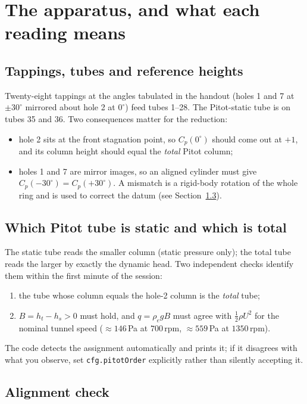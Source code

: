 \documentclass[11pt,a4paper]{article}
\newcommand{\Cp}{\ensuremath{C_p}}
\begin{document}
\section{The apparatus, and what each reading means}

\subsection{Tappings, tubes and reference heights}

Twenty-eight tappings at the angles tabulated in the handout (holes 1 and 7 at $\pm30^\circ$
mirrored about hole 2 at $0^\circ$) feed tubes 1--28. The Pitot-static tube is on tubes 35 and
36. Two consequences matter for the reduction:
\begin{itemize}[leftmargin=1.2em,itemsep=1pt,topsep=2pt]
\item hole 2 sits at the front stagnation point, so $\Cp(0^\circ)$ should come out at $+1$,
and its column height should equal the \emph{total} Pitot column;
\item holes 1 and 7 are mirror images, so an aligned cylinder must give
$\Cp(-30^\circ) = \Cp(+30^\circ)$. A mismatch is a rigid-body rotation of the whole ring and
is used to correct the datum (see Section~\ref{sec:align}).
\end{itemize}

\subsection{Which Pitot tube is static and which is total}

The static tube reads the smaller column (static pressure only); the total tube reads the
larger by exactly the dynamic head. Two independent checks identify them within the first
minute of the session:
\begin{enumerate}[leftmargin=1.4em,itemsep=1pt,topsep=2pt]
\item the tube whose column equals the hole-2 column is the \emph{total} tube;
\item $B = h_t - h_s > 0$ must hold, and $q = \rho_e g B$ must agree with
$\tfrac12 \rho U^2$ for the nominal tunnel speed ($\approx 146$\,Pa at $700$\,rpm,
$\approx 559$\,Pa at $1350$\,rpm).
\end{enumerate}
The code detects the assignment automatically and prints it; if it disagrees with what you
observe, set \texttt{cfg.pitotOrder} explicitly rather than silently accepting it.

\subsection{Alignment check}\label{sec:align}
\end{document}
